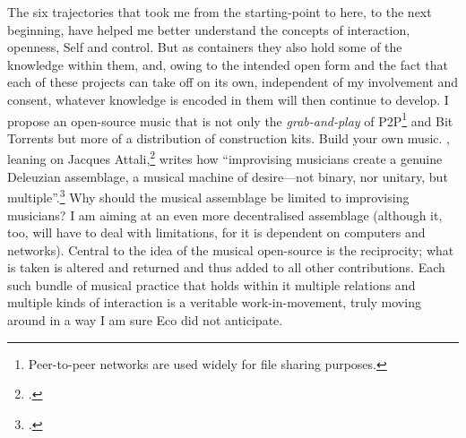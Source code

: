 The six trajectories that took me from the starting-point to here, to the next beginning, have helped me better understand the concepts of interaction, openness, Self and control. But as containers they also hold some of the knowledge within them, and, owing to the intended open form and the fact that each of these projects can take off on its own, independent of my involvement and consent, whatever knowledge is encoded in them will then continue to develop. I propose an open-source music that is not only the \emph{grab-and-play} of P2P\footnote{Peer-to-peer networks are used widely for file sharing purposes.} and Bit Torrents but more of a distribution of construction kits. Build your own music. \citeauthor{corbett94}, leaning on Jacques Attali,\footcite[See][]{attali85} writes how ``improvising musicians create a genuine Deleuzian assemblage, a musical machine of desire---not binary, nor unitary, but multiple''.\footcite[76]{corbett94} Why should the musical assemblage be limited to improvising musicians? I am aiming at an even more decentralised assemblage (although it, too, will have to deal with limitations, for it is dependent on computers and networks). Central to the idea of the musical open-source is the reciprocity; what is taken is altered and returned and thus added to all other contributions. Each such bundle of musical practice that holds within it multiple relations and multiple kinds of interaction is a veritable work-in-movement, truly moving around in a way I am sure Eco did not anticipate.
\newpage
\thispagestyle{empty}


